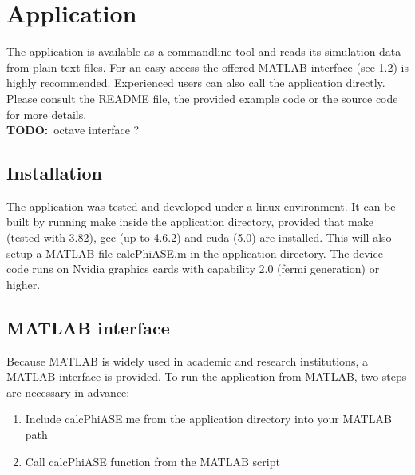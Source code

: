 \section{Application}

The application is available as a commandline-tool and reads
its simulation data from plain text files. 
For an easy access the offered MATLAB interface (see \ref{label:matlab_interface}) 
is highly recommended. Experienced users can also call the application
directly. Please consult the README file, the provided 
example code or the source code for more details.\\
\textbf{TODO:}~octave interface ?

\subsection{Installation}
The application was tested and developed under a linux environment.
It can be built by running make inside the application directory, provided
that make (tested with 3.82), gcc (up to 4.6.2) and cuda (5.0) are installed. 
This will also setup a MATLAB file calcPhiASE.m in the application
directory. The device code runs on Nvidia graphics cards with 
capability 2.0 (fermi generation) or higher. 

\subsection{MATLAB interface}
\label{label:matlab_interface}
Because MATLAB is widely used in academic and research institutions, a MATLAB
interface is provided. To run the application from MATLAB, two steps are
necessary in advance:
\begin{enumerate}
  \item Include calcPhiASE.me from the application directory into your MATLAB path
  \item Call calcPhiASE function from the MATLAB script
\end{enumerate}

